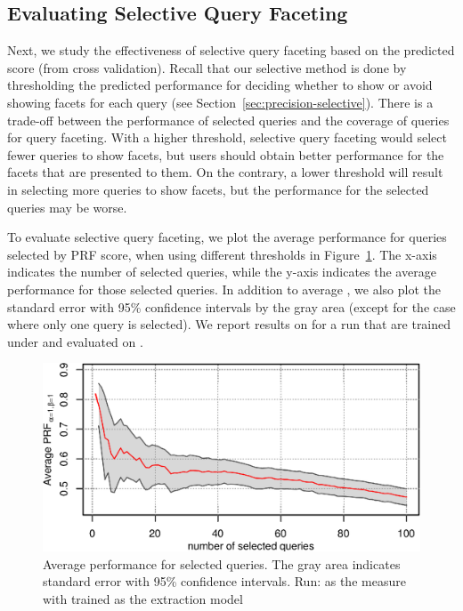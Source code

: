 \subsection{Evaluating Selective Query Faceting}
Next, we study the effectiveness of selective query faceting based on the predicted score (from cross validation). Recall that our selective method is done by thresholding the predicted performance for deciding whether to show or avoid showing facets for each query (see Section~\ref{sec:precision-selective}). There is a trade-off between the performance of selected queries and the coverage of queries for query faceting. With a higher threshold, selective query faceting would select fewer queries to show facets, but users should obtain better performance for the facets that are presented to them. On the contrary, a lower threshold will result in selecting more queries to show facets, but the performance for the selected queries may be worse. 

To evaluate selective query faceting, we plot the average \PRF performance for queries selected by PRF score, when using different thresholds in Figure~\ref{fig:selective}. The x-axis indicates the number of selected queries, while the y-axis indicates the average \PRF performance for those selected queries. In addition to average \PRF, we also plot the standard error with 95\% confidence intervals by the gray area (except for the case where only one query is selected). We report results on \DQF for a \QFI run that are trained under \MLE and evaluated on . 

\begin{figure}[H]
\centering
\caption{Average \PRF performance for selected queries. The gray area indicates standard error with 95\% confidence intervals. Run:  as the measure with \MLE trained \QFI as the extraction model}
\label{fig:selective}
\includegraphics[width=0.8\columnwidth]{figure/qf13-qp-prf-ll.eps}
\end{figure}

